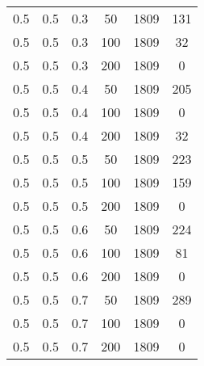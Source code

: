 \begin{table}[h]
\begin{center}
\begin{threeparttable}
\begin{tabular}{|c|c|c|c|c|c|}
	   \hline
		0.5 &  0.5 &  0.3 &   50 &  1809 &   131 \\
		0.5 &  0.5 &  0.3 &  100 &  1809 &    32 \\
		0.5 &  0.5 &  0.3 &  200 &  1809 &     0 \\
	   \hline
		0.5 &  0.5 &  0.4 &   50 &  1809 &   205 \\
		0.5 &  0.5 &  0.4 &  100 &  1809 &     0 \\
		0.5 &  0.5 &  0.4 &  200 &  1809 &    32 \\
	   \hline
		0.5 &  0.5 &  0.5 &   50 &  1809 &   223 \\
		0.5 &  0.5 &  0.5 &  100 &  1809 &   159 \\
		0.5 &  0.5 &  0.5 &  200 &  1809 &     0 \\
	   \hline
		0.5 &  0.5 &  0.6 &   50 &  1809 &   224 \\
		0.5 &  0.5 &  0.6 &  100 &  1809 &    81 \\
		0.5 &  0.5 &  0.6 &  200 &  1809 &     0 \\
	   \hline
		0.5 &  0.5 &  0.7 &   50 &  1809 &   289 \\
		0.5 &  0.5 &  0.7 &  100 &  1809 &     0 \\
		0.5 &  0.5 &  0.7 &  200 &  1809 &     0 \\
	   \hline
        		\end{tabular}
        \end{threeparttable}
	\end{center}
\end{table}
